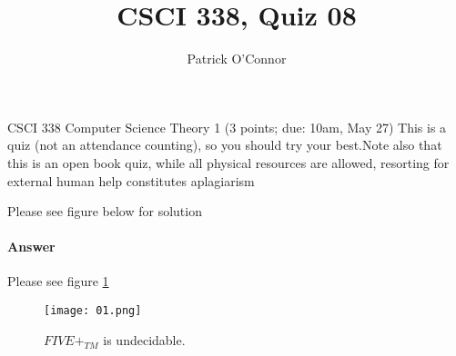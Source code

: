 \documentclass{article}
\title{CSCI 338, Quiz 08}
\author{Patrick O'Connor}
\begin{document}
\maketitle

CSCI 338 Computer Science Theory
1 (3 points; due: 10am, May 27)
This is a quiz (not an attendance counting), so you should 
try your best.Note also that this is an open book quiz, 
while all physical resources are allowed, resorting for external human 
help constitutes aplagiarism


Please see figure below for solution
\paragraph{Answer}

Please see figure \ref{fig:num01}
\begin{figure}
    \texttt{[image: 01.png]}
    \caption{$FIVE+_{TM}$ is undecidable.}
    \label{fig:num01}
\end{figure}
\end{document}
